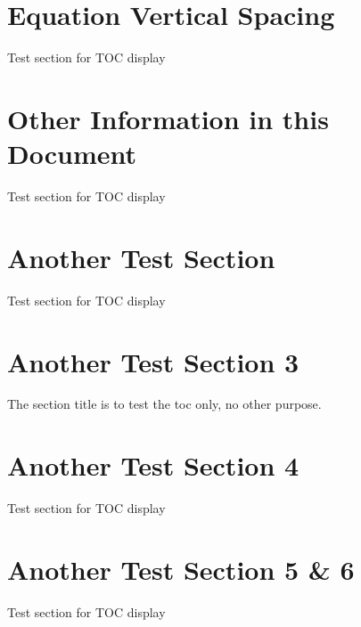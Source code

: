 {\section{Equation Vertical Spacing}

Test section for TOC display

\section{Other Information in this Document}
Test section for TOC display

\section{Another Test Section}
Test section for TOC display

\section{Another Test Section 3}
The section title is to test the toc only, no other purpose.

\section{Another Test Section 4}
Test section for TOC display

\section{Another Test Section 5 \& 6}
Test section for TOC display}







 





 

 
 

